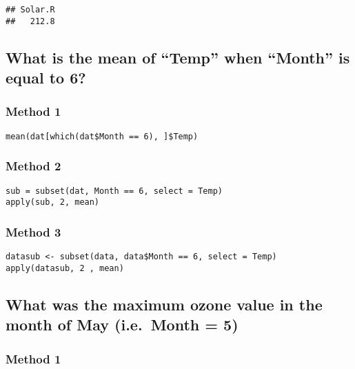 \documentclass[]{article}
\begin{document}
\begin{verbatim}
## Solar.R 
##   212.8
\end{verbatim}

\hypertarget{what-is-the-mean-of-temp-when-month-is-equal-to-6}{%
\subsection{What is the mean of ``Temp'' when ``Month'' is equal to
6?}\label{what-is-the-mean-of-temp-when-month-is-equal-to-6}}

\hypertarget{method-1-4}{%
\subsubsection{Method 1}\label{method-1-4}}

\begin{verbatim}
mean(dat[which(dat$Month == 6), ]$Temp)
\end{verbatim}

\hypertarget{method-2-5}{%
\subsubsection{Method 2}\label{method-2-5}}

\begin{verbatim}
sub = subset(dat, Month == 6, select = Temp)
apply(sub, 2, mean)
\end{verbatim}

\hypertarget{method-3-4}{%
\subsubsection{Method 3}\label{method-3-4}}

\begin{verbatim}
datasub <- subset(data, data$Month == 6, select = Temp)
apply(datasub, 2 , mean)
\end{verbatim}

\hypertarget{what-was-the-maximum-ozone-value-in-the-month-of-may-i.e.month-5}{%
\subsection{What was the maximum ozone value in the month of May
(i.e.~Month =
5)}\label{what-was-the-maximum-ozone-value-in-the-month-of-may-i.e.month-5}}

\hypertarget{method-1-5}{%
\subsubsection{Method 1}\label{method-1-5}}
\end{document}

